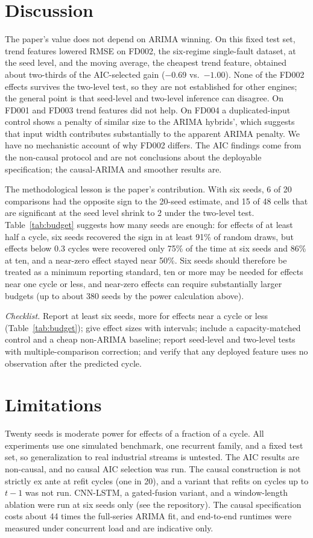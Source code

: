 \documentclass[conference]{IEEEtran}
\begin{document}
\section{Discussion}
The paper's value does not depend on ARIMA winning. On this fixed test set, trend features lowered RMSE on FD002, the six-regime single-fault dataset, at the seed level, and the moving average, the cheapest trend feature, obtained about two-thirds of the AIC-selected gain ($-0.69$ vs.\ $-1.00$). None of the FD002 effects survives the two-level test, so they are not established for other engines; the general point is that seed-level and two-level inference can disagree. On FD001 and FD003 trend features did not help. On FD004 a duplicated-input control shows a penalty of similar size to the ARIMA hybrids', which suggests that input width contributes substantially to the apparent ARIMA penalty. We have no mechanistic account of why FD002 differs. The AIC findings come from the non-causal protocol and are not conclusions about the deployable specification; the causal-ARIMA and smoother results are.

The methodological lesson is the paper's contribution. With six seeds, 6 of 20 comparisons had the opposite sign to the 20-seed estimate, and 15 of 48 cells that are significant at the seed level shrink to 2 under the two-level test. Table~\ref{tab:budget} suggests how many seeds are enough: for effects of at least half a cycle, six seeds recovered the sign in at least 91\% of random draws, but effects below 0.3 cycles were recovered only 75\% of the time at six seeds and 86\% at ten, and a near-zero effect stayed near 50\%. Six seeds should therefore be treated as a minimum reporting standard, ten or more may be needed for effects near one cycle or less, and near-zero effects can require substantially larger budgets (up to about 380 seeds by the power calculation above).

\emph{Checklist.} Report at least six seeds, more for effects near a cycle or less (Table~\ref{tab:budget}); give effect sizes with intervals; include a capacity-matched control and a cheap non-ARIMA baseline; report seed-level and two-level tests with multiple-comparison correction; and verify that any deployed feature uses no observation after the predicted cycle.

\section{Limitations}
Twenty seeds is moderate power for effects of a fraction of a cycle. All experiments use one simulated benchmark, one recurrent family, and a fixed test set, so generalization to real industrial streams is untested. The AIC results are non-causal, and no causal AIC selection was run. The causal construction is not strictly ex ante at refit cycles (one in 20), and a variant that refits on cycles up to $t-1$ was not run. CNN-LSTM, a gated-fusion variant, and a window-length ablation were run at six seeds only (see the repository). The causal specification costs about 44 times the full-series ARIMA fit, and end-to-end runtimes were measured under concurrent load and are indicative only.
\end{document}
